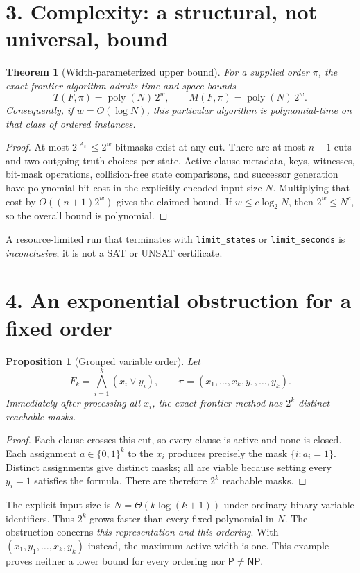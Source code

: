 \documentclass[11pt,a4paper]{article}
\newtheorem{theorem}{Theorem}
\newtheorem{proposition}{Proposition}
\newcommand{\NP}{\mathsf{NP}}
\newcommand{\PP}{\mathsf{P}}
\newcommand{\poly}{\operatorname{poly}}
\begin{document}
\section*{3. Complexity: a structural, not universal, bound}
\begin{theorem}[Width-parameterized upper bound]
For a supplied order $\pi$, the exact frontier algorithm admits time and space bounds
\[
T(F,\pi)=\poly(N)\,2^w,\qquad M(F,\pi)=\poly(N)\,2^w.
\]
Consequently, if $w=O(\log N)$, this particular algorithm is polynomial-time on that class of ordered instances.
\end{theorem}
\begin{proof}
At most $2^{|A_t|}\le 2^w$ bitmasks exist at any cut. There are at most $n+1$ cuts and two outgoing truth choices per state. Active-clause metadata, keys, witnesses, bit-mask operations, collision-free state comparisons, and successor generation have polynomial bit cost in the explicitly encoded input size $N$. Multiplying that cost by $O((n+1)2^w)$ gives the claimed bound. If $w\le c\log_2 N$, then $2^w\le N^c$, so the overall bound is polynomial.
\end{proof}
A resource-limited run that terminates with \texttt{limit\_states} or \texttt{limit\_seconds} is \emph{inconclusive}; it is not a SAT or UNSAT certificate.

\section*{4. An exponential obstruction for a fixed order}
\begin{proposition}[Grouped variable order]
Let
\[
F_k=\bigwedge_{i=1}^{k}(x_i\lor y_i),\qquad
\pi=(x_1,\ldots,x_k,y_1,\ldots,y_k).
\]
Immediately after processing all $x_i$, the exact frontier method has $2^k$ distinct reachable masks.
\end{proposition}
\begin{proof}
Each clause crosses this cut, so every clause is active and none is closed. Each assignment $a\in\{0,1\}^k$ to the $x_i$ produces precisely the mask $\{i:a_i=1\}$. Distinct assignments give distinct masks; all are viable because setting every $y_i=1$ satisfies the formula. There are therefore $2^k$ reachable masks.
\end{proof}
The explicit input size is $N=\Theta(k\log(k+1))$ under ordinary binary variable identifiers. Thus $2^k$ grows faster than every fixed polynomial in $N$. The obstruction concerns \emph{this representation and this ordering}. With $(x_1,y_1,\ldots,x_k,y_k)$ instead, the maximum active width is one. This example proves neither a lower bound for every ordering nor $\PP\ne\NP$.
\end{document}
